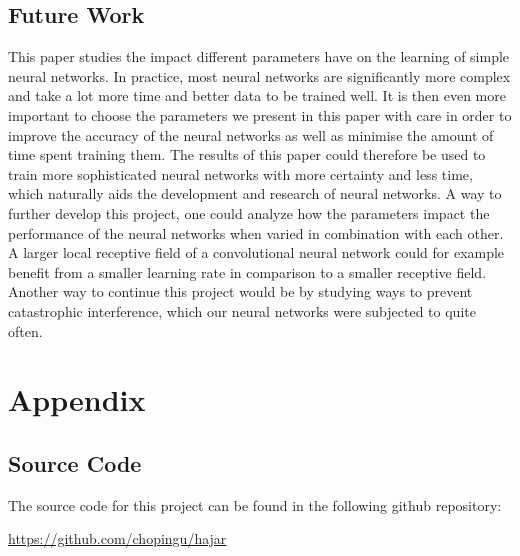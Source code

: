 \documentclass[titlepage]{article}
\begin{document}
\subsection{Future Work}

\vskip 0.2cm

This paper studies the impact different parameters have on the learning of simple neural networks. In practice, most neural networks are significantly more complex and take a lot more time and better data to be trained well. It is then even more important to choose the parameters we present in this paper with care in order to improve the accuracy of the neural networks as well as minimise the amount of time spent training them. The results of this paper could therefore be used to train more sophisticated neural networks with more certainty and less time, which naturally aids the development and research of neural networks. A way to further develop this project, one could analyze how the parameters impact the performance of the neural networks when varied in combination with each other. A larger local receptive field of a convolutional neural network could for example benefit from a smaller learning rate in comparison to a smaller receptive field. Another way to continue this project would be by studying ways to prevent catastrophic interference, which our neural networks were subjected to quite often. 

\newpage




\newpage

\appendix

\section{Appendix}
\subsection{Source Code}

\vskip 0.2cm

\centerline{The source code for this project can be found in the following github repository:}

\vskip 0.3cm

\centerline{\href{https://github.com/chopingu/hajar}{https://github.com/chopingu/hajar}}
\end{document}
